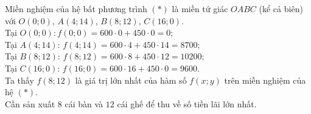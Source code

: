 \begin{bt}
{\begin{center}
\begin{tikzpicture}[line join=round, line cap=round,>=stealth,thick,scale=0.5]
		\end{tikzpicture}
	\end{center}
	Miền nghiệm của hệ bất phương trình $(*)$ là miền tứ giác $OABC$ (kể cả biên) với $O(0;0)$, $A(4;14)$, $B(8;12)$, $C(16;0)$.\\
	Tại $O(0;0): f(0;0)=600 \cdot 0 + 450 \cdot 0=0$;\\
	Tại $A(4;14)$: $f(4;14)=600 \cdot 4+450 \cdot 14=8700$; \\
	Tại $B(8;12)$: $f(8;12)=600 \cdot 8+450 \cdot 12=10200$;\\
	Tại $C(16;0)$: $f(16;0)=600 \cdot 16+450 \cdot 0=9600$.\\
	Ta thấy $f(8;12)$ là giá trị lớn nhất của hàm số $f(x;y)$ trên miền nghiệm của hệ $(*)$.\\
	Cần sản xuất $8$ cái bàn và $12$ cái ghế để thu về số tiền lãi lớn nhất.

	}
\end{bt}

